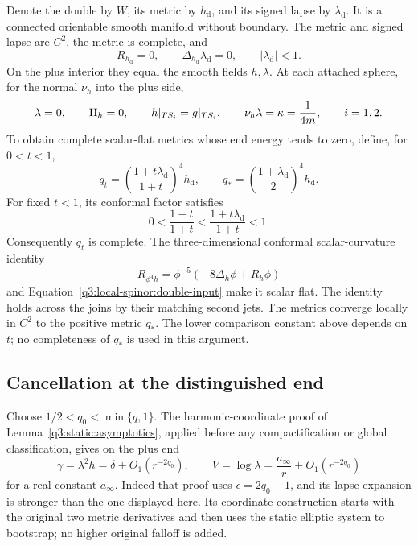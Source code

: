 Denote the double by \(W\), its metric by \(h_{\mathrm d}\), and
its signed lapse by \(\lambda_{\mathrm d}\). It is a connected
orientable smooth manifold without boundary. The metric and signed
lapse are \(C^2\), the metric is complete, and
\begin{equation}\label{q3:local-spinor:double-input}
 R_{h_{\mathrm d}}=0,\qquad
 \Delta_{h_{\mathrm d}}\lambda_{\mathrm d}=0,\qquad
 |\lambda_{\mathrm d}|<1.
\end{equation}
On the plus interior they equal the smooth fields \(h,\lambda\).
At each attached sphere, for the normal \(\nu_h\) into the plus side,
\begin{equation}\label{q3:local-spinor:horizon-input}
 \lambda=0,\qquad \mathrm{II}_h=0,\qquad
 h|_{TS_i}=g|_{TS_i},\qquad
 \nu_h\lambda=\kappa=\frac1{4m},\qquad i=1,2.
\end{equation}
To obtain complete scalar-flat metrics whose end energy tends to zero,
define, for \(0<t<1\),
\begin{equation}\label{q3:local-spinor:family}
 q_t=\left(\frac{1+t\lambda_{\mathrm d}}{1+t}\right)^4h_{\mathrm d},
 \qquad
 q_* =\left(\frac{1+\lambda_{\mathrm d}}2\right)^4h_{\mathrm d}.
\end{equation}
For fixed \(t<1\), its conformal factor satisfies
\[
 0<\frac{1-t}{1+t}
 <\frac{1+t\lambda_{\mathrm d}}{1+t}<1.
\]
Consequently \(q_t\) is complete. The three-dimensional conformal
scalar-curvature identity
\[
 R_{\phi^4h}=\phi^{-5}(-8\Delta_h\phi+R_h\phi)
\]
and Equation~\eqref{q3:local-spinor:double-input} make it scalar flat.
The identity holds across the joins by their matching second jets.
The metrics converge locally in \(C^2\) to the positive metric
\(q_*\). The lower comparison constant above depends on \(t\);
no completeness of \(q_*\) is used in this argument.

\subsection{Cancellation at the distinguished end}

Choose \(1/2<q_0<\min\{q,1\}\). The harmonic-coordinate proof of
Lemma~\ref{q3:static:asymptotics}, applied before any compactification
or global classification, gives on the plus end
\begin{equation}\label{q3:local-spinor:improved-end}
 \gamma=\lambda^2h=\delta+O_1(r^{-2q_0}),\qquad
 V=\log\lambda=\frac{a_\infty}{r}+O_1(r^{-2q_0})
\end{equation}
for a real constant \(a_\infty\). Indeed that proof uses
\(\epsilon=2q_0-1\), and its lapse expansion is stronger than the
one displayed here. Its coordinate construction starts with the original
two metric derivatives and then uses the static elliptic system to
bootstrap; no higher original falloff is added.

